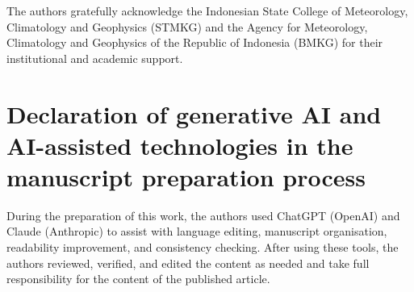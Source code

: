 \documentclass[preprint,12pt]{elsarticle}
\begin{document}
The authors gratefully acknowledge the Indonesian State College of Meteorology, Climatology and Geophysics (STMKG) and the Agency for Meteorology, Climatology and Geophysics of the Republic of Indonesia (BMKG) for their institutional and academic support.

\section*{Declaration of generative AI and AI-assisted technologies in the manuscript preparation process}

During the preparation of this work, the authors used ChatGPT (OpenAI) and Claude (Anthropic) to assist with language editing, manuscript organisation, readability improvement, and consistency checking. After using these tools, the authors reviewed, verified, and edited the content as needed and take full responsibility for the content of the published article.



\end{document}
